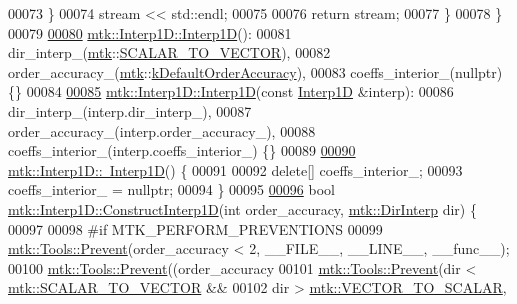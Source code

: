 \begin{DoxyCode}
00073   \}
00074   stream << std::endl;
00075 
00076   \textcolor{keywordflow}{return} stream;
00077 \}
00078 \}
00079 
\hypertarget{mtk__interp__1d_8cc_source_l00080}{}\hyperlink{classmtk_1_1Interp1D_ae56f90c53579c91c1dbe715f7e7361be}{00080} \hyperlink{classmtk_1_1Interp1D_ae56f90c53579c91c1dbe715f7e7361be}{mtk::Interp1D::Interp1D}():
00081   dir\_interp\_(\hyperlink{namespacemtk}{mtk}::\hyperlink{namespacemtk_ga674ec67bd1baa04e5dc06c2bcc351972abc9e2b8cd5a497c9f3252a792e356139}{SCALAR\_TO\_VECTOR}),
00082   order\_accuracy\_(\hyperlink{namespacemtk}{mtk}::\hyperlink{group__c01-roots_ga0d95560098eb36420511103637b6952f}{kDefaultOrderAccuracy}),
00083   coeffs\_interior\_(nullptr) \{\}
00084 
\hypertarget{mtk__interp__1d_8cc_source_l00085}{}\hyperlink{classmtk_1_1Interp1D_a92a5ed77144b3824d201a586f4072fd0}{00085} \hyperlink{classmtk_1_1Interp1D_ae56f90c53579c91c1dbe715f7e7361be}{mtk::Interp1D::Interp1D}(\textcolor{keyword}{const} \hyperlink{classmtk_1_1Interp1D}{Interp1D} &interp):
00086   dir\_interp\_(interp.dir\_interp\_),
00087   order\_accuracy\_(interp.order\_accuracy\_),
00088   coeffs\_interior\_(interp.coeffs\_interior\_) \{\}
00089 
\hypertarget{mtk__interp__1d_8cc_source_l00090}{}\hyperlink{classmtk_1_1Interp1D_a52ea06b5e3d7082eb06ade256f4e30fb}{00090} \hyperlink{classmtk_1_1Interp1D_a52ea06b5e3d7082eb06ade256f4e30fb}{mtk::Interp1D::~Interp1D}() \{
00091 
00092   \textcolor{keyword}{delete}[] coeffs\_interior\_;
00093   coeffs\_interior\_ = \textcolor{keyword}{nullptr};
00094 \}
00095 
\hypertarget{mtk__interp__1d_8cc_source_l00096}{}\hyperlink{classmtk_1_1Interp1D_ab1c8e12534886aa185b24be474d1056e}{00096} \textcolor{keywordtype}{bool} \hyperlink{classmtk_1_1Interp1D_ab1c8e12534886aa185b24be474d1056e}{mtk::Interp1D::ConstructInterp1D}(\textcolor{keywordtype}{int} order\_accuracy, 
      \hyperlink{group__c02-enums_ga674ec67bd1baa04e5dc06c2bcc351972}{mtk::DirInterp} dir) \{
00097 
00098 \textcolor{preprocessor}{  #if MTK\_PERFORM\_PREVENTIONS}
00099   \hyperlink{classmtk_1_1Tools_a332324c6f25e66be9dff48c5987a3b9f}{mtk::Tools::Prevent}(order\_accuracy < 2, \_\_FILE\_\_, \_\_LINE\_\_, \_\_func\_\_);
00100   \hyperlink{classmtk_1_1Tools_a332324c6f25e66be9dff48c5987a3b9f}{mtk::Tools::Prevent}((order\_accuracy%
00101   \hyperlink{classmtk_1_1Tools_a332324c6f25e66be9dff48c5987a3b9f}{mtk::Tools::Prevent}(dir < \hyperlink{namespacemtk_ga674ec67bd1baa04e5dc06c2bcc351972abc9e2b8cd5a497c9f3252a792e356139}{mtk::SCALAR\_TO\_VECTOR} &&
00102                       dir > \hyperlink{namespacemtk_ga674ec67bd1baa04e5dc06c2bcc351972a122cf2e24aef105e9214698206af6904}{mtk::VECTOR\_TO\_SCALAR},

\end{DoxyCode}
